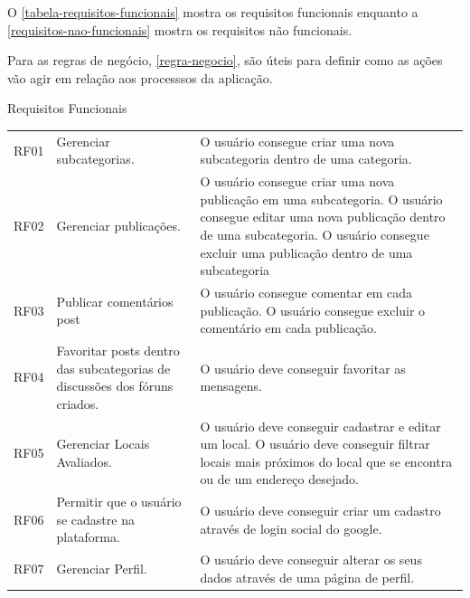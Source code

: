 O  \autoref{tabela-requisitos-funcionais} mostra os requisitos funcionais  enquanto a \autoref{requisitos-nao-funcionais} mostra os requisitos não funcionais. 

Para as regras de negócio, \autoref{regra-negocio}, são úteis para definir como as ações vão agir em relação aos processsos da aplicação. 



\begin{quadro}[htb]
	\centering
	\ABNTEXfontereduzida
	\caption[Requisitos Funcionais]{Requisitos Funcionais}
	\label{tabela-requisitos-funcionais}
\end{quadro}
\begin{longtable}{|p{2.0cm}|p{6.5cm}|p{6.5cm}|}
	\hline
	\thead{Código} & \thead{Requisito}  & \thead{Descrição} \\
	\hline
	RF01 & Gerenciar subcategorias. &
	O usuário consegue criar uma nova subcategoria dentro de uma categoria.
	\\
	\hline
	RF02 & Gerenciar publicações.   & O usuário consegue criar uma nova publicação em uma subcategoria. 
	O usuário consegue editar uma nova publicação dentro de uma subcategoria. 
	O usuário consegue excluir uma publicação dentro de uma subcategoria\\
	\hline
	RF03 & Publicar comentários post  & O usuário consegue comentar em cada publicação. O usuário consegue excluir o comentário em cada publicação. \\
	\hline
	RF04 & Favoritar posts dentro das subcategorias de discussões dos fóruns criados. & O usuário deve conseguir favoritar as mensagens. \\
	\hline
	RF05 & Gerenciar Locais Avaliados. & O usuário deve conseguir cadastrar e editar um local. O usuário deve conseguir filtrar locais mais próximos do local que se encontra ou de um endereço desejado. \\
	\hline
	RF06 & Permitir que o usuário se cadastre na plataforma. & O usuário deve conseguir criar um cadastro através de login social do google.\\
	\hline
	RF07 & Gerenciar Perfil.  &
	O usuário deve conseguir alterar os seus dados através de uma página de perfil.  \\
	\hline
\end{longtable}

